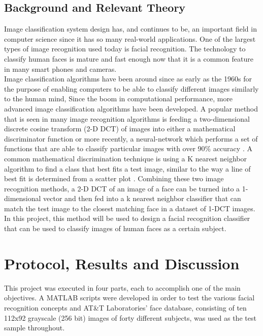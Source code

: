 \documentclass[conference]{IEEEtran}
\begin{document}
\subsection{Background and Relevant Theory}
Image classification system design has, and continues to be, an important field
in computer science since it has so many real-world applications.
One of the largest types of image recognition used today is facial recognition.
The technology to classify human faces is mature and fast enough now that it is
a common feature in many smart phones and cameras.
\\
Image classification algorithms have been around since as early as the 1960s for
the purpose of enabling computers to be able to classify different images
similarly to the human mind, Since the boom in computational performance, more
advanced image classification algorithms have been developed. A popular method
that is seen in many image recognition algorithms is feeding a two-dimensional
discrete cosine transform (2-D DCT) of images into either a mathematical
discriminator function or more recently, a neural-network which performs a set
of functions that are able to classify particular images with over 90\% accuracy
\cite{neural} \cite{new facial} \cite{discriminating}. A common mathematical
discrimination technique is using a K nearest neighbor algorithm to find a class
that best fits a test image, similar to the way a line of best fit is determined
from a scatter plot \cite{k classifier}. Combining these two image recognition
methods, a 2-D DCT of an image of a face can be turned into a 1-dimensional vector and
then fed into a k nearest neighbor classifier that can match the test image to
the closest matching face in a dataset of 1-DCT images. In this project, this
method will be used to design a facial recognition classifier that can be used
to classify images of human faces as a certain subject.

\section{Protocol, Results and Discussion}

This project was executed in four parts, each to accomplish one of the main
objectives. A MATLAB\texttrademark{} scripts were developed in order to test the
various facial recognition concepts and AT\&T Laboratories' face database,
consisting of ten 112x92 grayscale (256 bit) images of forty different
subjects, was used as the test sample throughout.
\end{document}

